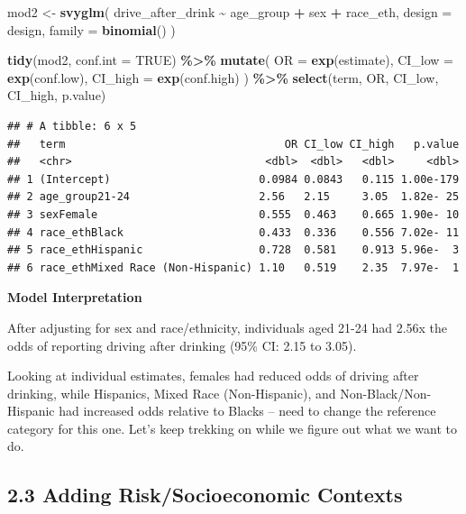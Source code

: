 \documentclass[
]{article}
\newenvironment{Shaded}{\begin{snugshade}}{\end{snugshade}}
\newcommand{\AttributeTok}[1]{\textcolor[rgb]{0.13,0.29,0.53}{#1}}
\newcommand{\ConstantTok}[1]{\textcolor[rgb]{0.56,0.35,0.01}{#1}}
\newcommand{\FunctionTok}[1]{\textcolor[rgb]{0.13,0.29,0.53}{\textbf{#1}}}
\newcommand{\NormalTok}[1]{#1}
\newcommand{\OtherTok}[1]{\textcolor[rgb]{0.56,0.35,0.01}{#1}}
\newcommand{\SpecialCharTok}[1]{\textcolor[rgb]{0.81,0.36,0.00}{\textbf{#1}}}
\begin{document}
\begin{Shaded}
\begin{Highlighting}[]
\NormalTok{mod2 }\OtherTok{\textless{}{-}} \FunctionTok{svyglm}\NormalTok{(}
\NormalTok{  drive\_after\_drink }\SpecialCharTok{\textasciitilde{}}\NormalTok{ age\_group }\SpecialCharTok{+}\NormalTok{ sex }\SpecialCharTok{+}\NormalTok{ race\_eth,}
  \AttributeTok{design =}\NormalTok{ design,}
  \AttributeTok{family =} \FunctionTok{binomial}\NormalTok{()}
\NormalTok{) }

\FunctionTok{tidy}\NormalTok{(mod2, }\AttributeTok{conf.int =} \ConstantTok{TRUE}\NormalTok{) }\SpecialCharTok{\%\textgreater{}\%}
  \FunctionTok{mutate}\NormalTok{(}
    \AttributeTok{OR =} \FunctionTok{exp}\NormalTok{(estimate),}
    \AttributeTok{CI\_low =} \FunctionTok{exp}\NormalTok{(conf.low),}
    \AttributeTok{CI\_high =} \FunctionTok{exp}\NormalTok{(conf.high)}
\NormalTok{  ) }\SpecialCharTok{\%\textgreater{}\%}
  \FunctionTok{select}\NormalTok{(term, OR, CI\_low, CI\_high, p.value)}
\end{Highlighting}
\end{Shaded}

\begin{verbatim}
## # A tibble: 6 x 5
##   term                                  OR CI_low CI_high   p.value
##   <chr>                              <dbl>  <dbl>   <dbl>     <dbl>
## 1 (Intercept)                       0.0984 0.0843   0.115 1.00e-179
## 2 age_group21-24                    2.56   2.15     3.05  1.82e- 25
## 3 sexFemale                         0.555  0.463    0.665 1.90e- 10
## 4 race_ethBlack                     0.433  0.336    0.556 7.02e- 11
## 5 race_ethHispanic                  0.728  0.581    0.913 5.96e-  3
## 6 race_ethMixed Race (Non-Hispanic) 1.10   0.519    2.35  7.97e-  1
\end{verbatim}

\textbf{Model Interpretation}

After adjusting for sex and race/ethnicity, individuals aged 21-24 had
2.56x the odds of reporting driving after drinking (95\% CI: 2.15 to
3.05).

Looking at individual estimates, females had reduced odds of driving
after drinking, while Hispanics, Mixed Race (Non-Hispanic), and
Non-Black/Non-Hispanic had increased odds relative to Blacks -- need to
change the reference category for this one. Let's keep trekking on while
we figure out what we want to do.

\subsection{2.3 Adding Risk/Socioeconomic
Contexts}\label{adding-risksocioeconomic-contexts}
\end{document}
